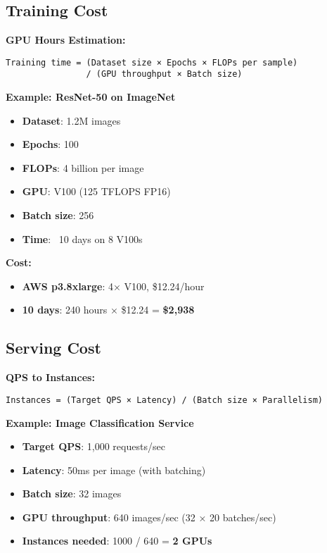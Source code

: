 \documentclass[8pt,landscape]{article}
\begin{document}
\begin{multicols}{3}
\subsection*{Training Cost}

\textbf{GPU Hours Estimation:}
\begin{verbatim}
Training time = (Dataset size × Epochs × FLOPs per sample)
                / (GPU throughput × Batch size)
\end{verbatim}

\textbf{Example: ResNet-50 on ImageNet}
\begin{itemize}
\item \textbf{Dataset}: 1.2M images
\item \textbf{Epochs}: 100
\item \textbf{FLOPs}: 4 billion per image
\item \textbf{GPU}: V100 (125 TFLOPS FP16)
\item \textbf{Batch size}: 256
\item \textbf{Time}: ~10 days on 8 V100s
\end{itemize}

\textbf{Cost:}
\begin{itemize}
\item \textbf{AWS p3.8xlarge}: 4× V100, \$12.24/hour
\item \textbf{10 days}: 240 hours × \$12.24 = \textbf{\$2,938}
\end{itemize}

\subsection*{Serving Cost}

\textbf{QPS to Instances:}
\begin{verbatim}
Instances = (Target QPS × Latency) / (Batch size × Parallelism)
\end{verbatim}

\textbf{Example: Image Classification Service}
\begin{itemize}
\item \textbf{Target QPS}: 1,000 requests/sec
\item \textbf{Latency}: 50ms per image (with batching)
\item \textbf{Batch size}: 32 images
\item \textbf{GPU throughput}: 640 images/sec (32 × 20 batches/sec)
\item \textbf{Instances needed}: 1000 / 640 = \textbf{2 GPUs}
\end{itemize}


\end{multicols}
\end{document}

